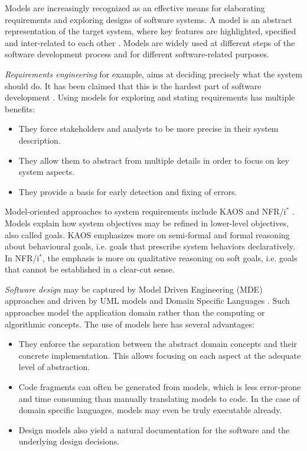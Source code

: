 Models are increasingly recognized as an effective means for elaborating requirements and exploring designs of software systems. A model is an abstract representation of the target system, where key features are highlighted, specified and inter-related to each other \cite{VanLamsweerde:2009}. Models are widely used at different steps of the software development process and for different software-related purposes.


\emph{Requirements engineering} for example, aims at deciding precisely what the system should do. It has been claimed that this is the hardest part of software development \cite{Brooks:1987}. Using models for exploring and stating requirements has multiple benefits:

\begin{itemize}
\item They force stakeholders and analysts to be more precise in their system description.
\item They allow them to abstract from multiple details in order to focus on key system aspects.
\item They provide a basis for early detection and fixing of errors.
\end{itemize}

Model-oriented approaches to system requirements include KAOS \cite{VanLamsweerde:2009} and NFR/i$^*$ \cite{Mylopoulos:1992, Yu:1993}. Models explain how system objectives may be refined in lower-level objectives, also called goals. KAOS emphasizes more on semi-formal and formal reasoning about behavioural goals, i.e. goals that prescribe system behaviors declaratively. In NFR/i$^*$, the emphasis is more on qualitative reasoning on soft goals, i.e. goals that cannot be established in a clear-cut sense.


\emph{Software design} may be captured by Model Driven Engineering (MDE) approaches and driven by UML models \cite{OMG:2004} and Domain Specific Languages \cite{VanDeursen:2000, Fowler:2010}. Such approaches model the application domain rather than the computing or algorithmic concepts. The use of models here has several advantages:

\begin{itemize}
\item They enforce the separation between the abstract domain concepts and their concrete implementation. This allows focusing on each aspect at the adequate level of abstraction.
\item Code fragments can often be generated from models, which is less error-prone and time consuming than manually translating models to code. In the case of domain specific languages, models may even be truly executable already. 
\item Design models also yield a natural documentation for the software and the underlying design decisions. 
\end{itemize}

